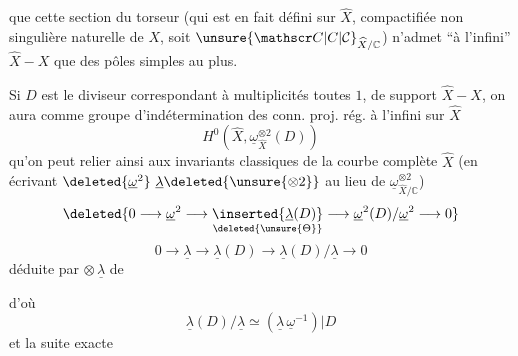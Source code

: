 que cette section du torseur (qui est
en fait défini sur $\widehat X$, compactifiée
non singulière naturelle de $X$, \unsure{\}|)} soit
${\unsure{\mathscr C|C|\mathcal C}}_{\widehat X/\mathbb C}$) n'admet ``à l'infini'' $\widehat X-X$
que des pôles simples au plus.

Si $D$ est le diviseur correspondant
 à multiplicités toutes $1$, de support $\widehat X-X$,
on aura comme groupe d'indétermination
des conn. proj. rég. à l'infini sur $\widehat X$
\[
 H^0(\widehat X,\underline\omega_{\widehat X}^{\otimes2}(D))
\]
qu'on peut relier ainsi aux invariants classiques
de la courbe complète $\widehat X$ (en écrivant
 $\deleted{\underline{\omega}^{2}}\ \underline\lambda\deleted{\unsure{\otimes2}}$ au lieu de $\underline{\omega}^{\otimes2}_{\widehat X/\mathbb C}$)
\[
\deleted{0\longrightarrow\underline{\omega}^{2}\longrightarrow
 \underset{\deleted{\unsure{\Theta}}}{\inserted{\underline\lambda(D)}}\longrightarrow
 \underline{\omega}^{2}(D)/\underline{\omega}^{2}\longrightarrow0}
\]
\[
0\longrightarrow\underline\lambda\longrightarrow\underline\lambda(D)
\longrightarrow\underline\lambda(D)/\underline\lambda\longrightarrow0
\]
déduite par $\otimes\,\underline\lambda$ de


d'où
\[
\underline\lambda(D)/\underline\lambda\simeq(\underline\lambda\,\underline\omega^{-1})|D
\]
et la suite exacte


